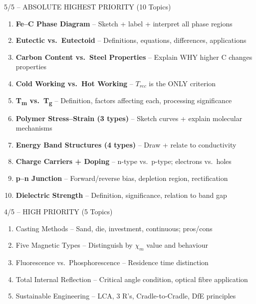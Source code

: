 \documentclass[11pt,a4paper]{article}
\newcommand{\HI}[1]{\colorbox{yellow!20}{\textcolor{DarkPurple}{\textbf{#1}}}}
\begin{document}
\begin{critbox}{5/5 -- ABSOLUTE HIGHEST PRIORITY (10 Topics)}
\begin{enumerate}[leftmargin=*,nosep]
    \item \HI{Fe--C Phase Diagram} -- Sketch + label + interpret all phase regions
    \item \HI{Eutectic vs.\ Eutectoid} -- Definitions, equations, differences, applications
    \item \HI{Carbon Content vs.\ Steel Properties} -- Explain WHY higher C changes properties
    \item \HI{Cold Working vs.\ Hot Working} -- $T_{rec}$ is the ONLY criterion
    \item \HI{T\textsubscript{m} vs.\ T\textsubscript{g}} -- Definition, factors affecting each, processing significance
    \item \HI{Polymer Stress--Strain (3 types)} -- Sketch curves + explain molecular mechanisms
    \item \HI{Energy Band Structures (4 types)} -- Draw + relate to conductivity
    \item \HI{Charge Carriers + Doping} -- n-type vs.\ p-type; electrons vs.\ holes
    \item \HI{p--n Junction} -- Forward/reverse bias, depletion region, rectification
    \item \HI{Dielectric Strength} -- Definition, significance, relation to band gap
\end{enumerate}
\end{critbox}

\begin{impbox}{4/5 -- HIGH PRIORITY (5 Topics)}
\begin{enumerate}[leftmargin=*,start=11,nosep]
    \item Casting Methods -- Sand, die, investment, continuous; pros/cons
    \item Five Magnetic Types -- Distinguish by $\chi_m$ value and behaviour
    \item Fluorescence vs.\ Phosphorescence -- Residence time distinction
    \item Total Internal Reflection -- Critical angle condition, optical fibre application
    \item Sustainable Engineering -- LCA, 3 R's, Cradle-to-Cradle, DfE principles
\end{enumerate}
\end{impbox}
\end{document}
